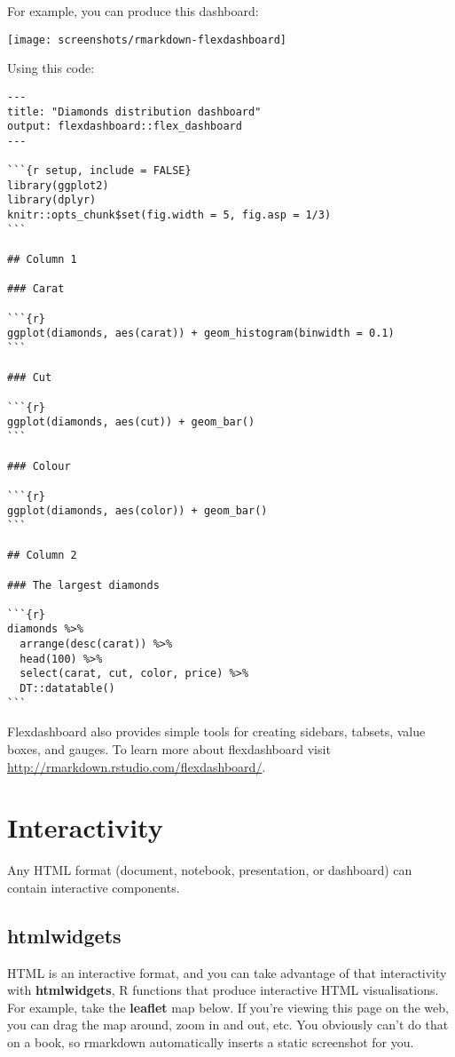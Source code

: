 \documentclass[]{book}
\begin{document}
For example, you can produce this dashboard:

\begin{center}\texttt{[image: screenshots/rmarkdown-flexdashboard]} \end{center}

Using this code:

\begin{verbatim}
---
title: "Diamonds distribution dashboard"
output: flexdashboard::flex_dashboard
---

```{r setup, include = FALSE}
library(ggplot2)
library(dplyr)
knitr::opts_chunk$set(fig.width = 5, fig.asp = 1/3)
```

## Column 1

### Carat

```{r}
ggplot(diamonds, aes(carat)) + geom_histogram(binwidth = 0.1)
```

### Cut

```{r}
ggplot(diamonds, aes(cut)) + geom_bar()
```

### Colour

```{r}
ggplot(diamonds, aes(color)) + geom_bar()
```

## Column 2

### The largest diamonds

```{r}
diamonds %>% 
  arrange(desc(carat)) %>% 
  head(100) %>% 
  select(carat, cut, color, price) %>% 
  DT::datatable()
```
\end{verbatim}

Flexdashboard also provides simple tools for creating sidebars, tabsets,
value boxes, and gauges. To learn more about flexdashboard visit
\url{http://rmarkdown.rstudio.com/flexdashboard/}.

\section{Interactivity}\label{interactivity}

Any HTML format (document, notebook, presentation, or dashboard) can
contain interactive components.

\subsection{htmlwidgets}\label{htmlwidgets}

HTML is an interactive format, and you can take advantage of that
interactivity with \textbf{htmlwidgets}, R functions that produce
interactive HTML visualisations. For example, take the \textbf{leaflet}
map below. If you're viewing this page on the web, you can drag the map
around, zoom in and out, etc. You obviously can't do that on a book, so
rmarkdown automatically inserts a static screenshot for you.
\end{document}
